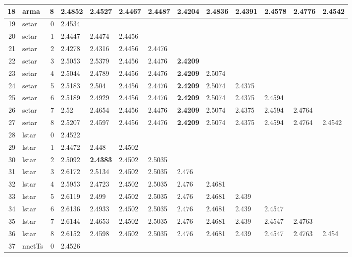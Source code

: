 \documentclass[10pt,a4paper]{article}
\begin{document}
\begin{table}[ht]
\begin{tabular}{rlrllllllllll}
  18 & arma &     8 & 2.4852 & 2.4527 & 2.4467 & 2.4487 & \textbf{2.4204} & 2.4836 & 2.4391 & 2.4578 & 2.4776 & 2.4542 \\ 
   \hline
19 & setar &     0 & 2.4534 &  &  &  &  &  &  &  &  &  \\ 
  20 & setar &     1 & 2.4447 & 2.4474 & 2.4456 &  &  &  &  &  &  &  \\ 
  21 & setar &     2 & 2.4278 & 2.4316 & 2.4456 & 2.4476 &  &  &  &  &  &  \\ 
  22 & setar &     3 & 2.5053 & 2.5379 & 2.4456 & 2.4476 & \textbf{2.4209} &  &  &  &  &  \\ 
  23 & setar &     4 & 2.5044 & 2.4789 & 2.4456 & 2.4476 & \textbf{2.4209} & 2.5074 &  &  &  &  \\ 
  24 & setar &     5 & 2.5183 & 2.504 & 2.4456 & 2.4476 & \textbf{2.4209} & 2.5074 & 2.4375 &  &  &  \\ 
  25 & setar &     6 & 2.5189 & 2.4929 & 2.4456 & 2.4476 & \textbf{2.4209} & 2.5074 & 2.4375 & 2.4594 &  &  \\ 
  26 & setar &     7 & 2.52 & 2.4654 & 2.4456 & 2.4476 & \textbf{2.4209} & 2.5074 & 2.4375 & 2.4594 & 2.4764 &  \\ 
  27 & setar &     8 & 2.5207 & 2.4597 & 2.4456 & 2.4476 & \textbf{2.4209} & 2.5074 & 2.4375 & 2.4594 & 2.4764 & 2.4542 \\ 
   \hline
28 & lstar &     0 & 2.4522 &  &  &  &  &  &  &  &  &  \\ 
  29 & lstar &     1 & 2.4472 & 2.448 & 2.4502 &  &  &  &  &  &  &  \\ 
  30 & lstar &     2 & 2.5092 & \textbf{2.4383} & 2.4502 & 2.5035 &  &  &  &  &  &  \\ 
  31 & lstar &     3 & 2.6172 & 2.5134 & 2.4502 & 2.5035 & 2.476 &  &  &  &  &  \\ 
  32 & lstar &     4 & 2.5953 & 2.4723 & 2.4502 & 2.5035 & 2.476 & 2.4681 &  &  &  &  \\ 
  33 & lstar &     5 & 2.6119 & 2.499 & 2.4502 & 2.5035 & 2.476 & 2.4681 & 2.439 &  &  &  \\ 
  34 & lstar &     6 & 2.6136 & 2.4933 & 2.4502 & 2.5035 & 2.476 & 2.4681 & 2.439 & 2.4547 &  &  \\ 
  35 & lstar &     7 & 2.6144 & 2.4653 & 2.4502 & 2.5035 & 2.476 & 2.4681 & 2.439 & 2.4547 & 2.4763 &  \\ 
  36 & lstar &     8 & 2.6152 & 2.4598 & 2.4502 & 2.5035 & 2.476 & 2.4681 & 2.439 & 2.4547 & 2.4763 & 2.454 \\ 
   \hline
37 & nnetTs &     0 & 2.4526 &  &  &  &  &  &  &  &  &  \\ 

\end{tabular}
\end{table}
\end{document}
